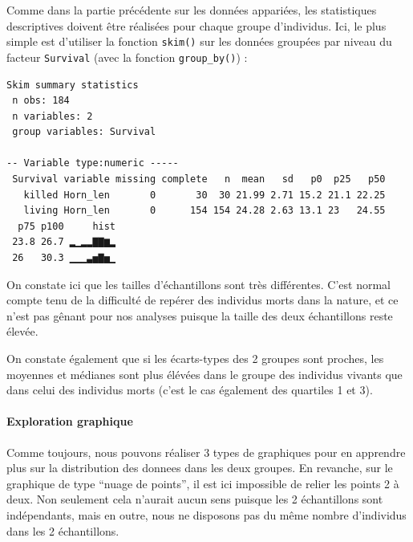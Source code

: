 \documentclass[a4paperpaper,]{article}
\newenvironment{Shaded}{\begin{snugshade}}{\end{snugshade}}
\newcommand{\KeywordTok}[1]{\textcolor[rgb]{0.12,0.11,0.11}{\textbf{#1}}}
\newcommand{\NormalTok}[1]{\textcolor[rgb]{0.12,0.11,0.11}{#1}}
\newcommand{\OperatorTok}[1]{\textcolor[rgb]{0.12,0.11,0.11}{#1}}
\newcommand{\StringTok}[1]{\textcolor[rgb]{0.75,0.01,0.01}{#1}}
\let\oldparagraph\paragraph
\renewcommand{\paragraph}[1]{\oldparagraph{#1}\mbox{}}
\begin{document}
Comme dans la partie précédente sur les données appariées, les statistiques descriptives doivent être réalisées pour chaque groupe d'individus. Ici, le plus simple est d'utiliser la fonction \texttt{skim()} sur les données groupées par niveau du facteur \texttt{Survival} (avec la fonction \texttt{group\_by()}) :

\begin{Shaded}
\end{Shaded}

\begin{verbatim}
Skim summary statistics
 n obs: 184 
 n variables: 2 
 group variables: Survival 

-- Variable type:numeric -----
 Survival variable missing complete   n  mean   sd   p0  p25   p50
   killed Horn_len       0       30  30 21.99 2.71 15.2 21.1 22.25
   living Horn_len       0      154 154 24.28 2.63 13.1 23   24.55
  p75 p100     hist
 23.8 26.7 ▂▁▂▂▇▇▆▂
 26   30.3 ▁▁▁▃▅▇▅▁
\end{verbatim}

On constate ici que les tailles d'échantillons sont très différentes. C'est normal compte tenu de la difficulté de repérer des individus morts dans la nature, et ce n'est pas gênant pour nos analyses puisque la taille des deux échantillons reste élevée.

On constate également que si les écarts-types des 2 groupes sont proches, les moyennes et médianes sont plus élévées dans le groupe des individus vivants que dans celui des individus morts (c'est le cas également des quartiles 1 et 3).

\hypertarget{exploration-graphique-2}{%
\paragraph{Exploration graphique}\label{exploration-graphique-2}}

Comme toujours, nous pouvons réaliser 3 types de graphiques pour en apprendre plus sur la distribution des donnees dans les deux groupes. En revanche, sur le graphique de type ``nuage de points'', il est ici impossible de relier les points 2 à deux. Non seulement cela n'aurait aucun sens puisque les 2 échantillons sont indépendants, mais en outre, nous ne disposons pas du même nombre d'individus dans les 2 échantillons.
\end{document}
